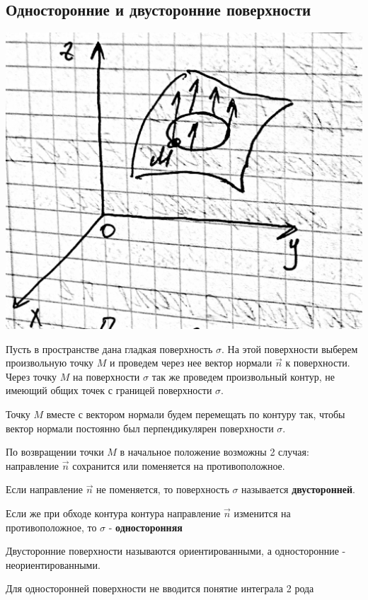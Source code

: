 
\subsection{Односторонние и двусторонние поверхности}
\includegraphics[width=\linewidth]{img/3.jpg}

Пусть в пространстве дана гладкая поверхность $\sigma$. На этой поверхности выберем произвольную точку $M$ и проведем через нее вектор нормали $\overrightarrow{n}$ к поверхности. Через точку $M$ на поверхности $\sigma$ так же проведем произвольный контур, не имеющий общих точек с границей поверхности $\sigma$.

Точку $M$ вместе с вектором нормали будем перемещать по контуру так, чтобы вектор нормали постоянно был перпендикулярен поверхности $\sigma$. 

По возвращении точки $M$ в начальное положение возможны 2 случая: направление $\overrightarrow{n}$ сохранится или поменяется на противоположное. 

Если направление $\overrightarrow{n}$ не поменяется, то поверхность $\sigma$ называется \textbf{двусторонней}.

Если же при обходе контура контура направление $\overrightarrow{n}$ изменится на противоположное, то $\sigma$ - \textbf{односторонняя} 

Двусторонние поверхности называются ориентированными, а односторонние - неориентированными.

Для односторонней поверхности не вводится понятие интеграла 2 рода

